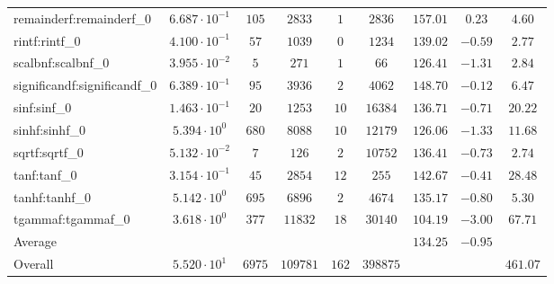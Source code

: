 \begin{tabular}{|l|c|c|c|c|c|c|c|c|}
remainderf:remainderf\_0     & $ 6.687 \cdot 10^{-1} $ & $ 105    $ & $ 2833   $ & $ 1   $ & $ 2836   $ & $ 157.01      $ & $ 0.23    $ & $ 4.60    $ \\
rintf:rintf\_0               & $ 4.100 \cdot 10^{-1} $ & $ 57     $ & $ 1039   $ & $ 0   $ & $ 1234   $ & $ 139.02      $ & $ -0.59   $ & $ 2.77    $ \\
scalbnf:scalbnf\_0           & $ 3.955 \cdot 10^{-2} $ & $ 5      $ & $ 271    $ & $ 1   $ & $ 66     $ & $ 126.41      $ & $ -1.31   $ & $ 2.84    $ \\
significandf:significandf\_0 & $ 6.389 \cdot 10^{-1} $ & $ 95     $ & $ 3936   $ & $ 2   $ & $ 4062   $ & $ 148.70      $ & $ -0.12   $ & $ 6.47    $ \\
sinf:sinf\_0                 & $ 1.463 \cdot 10^{-1} $ & $ 20     $ & $ 1253   $ & $ 10  $ & $ 16384  $ & $ 136.71      $ & $ -0.71   $ & $ 20.22   $ \\
sinhf:sinhf\_0               & $ 5.394 \cdot 10^{0}  $ & $ 680    $ & $ 8088   $ & $ 10  $ & $ 12179  $ & $ 126.06      $ & $ -1.33   $ & $ 11.68   $ \\
sqrtf:sqrtf\_0               & $ 5.132 \cdot 10^{-2} $ & $ 7      $ & $ 126    $ & $ 2   $ & $ 10752  $ & $ 136.41      $ & $ -0.73   $ & $ 2.74    $ \\
tanf:tanf\_0                 & $ 3.154 \cdot 10^{-1} $ & $ 45     $ & $ 2854   $ & $ 12  $ & $ 255    $ & $ 142.67      $ & $ -0.41   $ & $ 28.48   $ \\
tanhf:tanhf\_0               & $ 5.142 \cdot 10^{0}  $ & $ 695    $ & $ 6896   $ & $ 2   $ & $ 4674   $ & $ 135.17      $ & $ -0.80   $ & $ 5.30    $ \\
tgammaf:tgammaf\_0           & $ 3.618 \cdot 10^{0}  $ & $ 377    $ & $ 11832  $ & $ 18  $ & $ 30140  $ & $ 104.19      $ & $ -3.00   $ & $ 67.71   $ \\
\hline
Average                      & $                     $ & $        $ & $        $ & $     $ & $        $ & $ 134.25      $ & $ -0.95   $ & $         $ \\
\hline
Overall                      & $ 5.520 \cdot 10^{1}  $ & $ 6975   $ & $ 109781 $ & $ 162 $ & $ 398875 $ & $             $ & $         $ & $ 461.07  $ \\
\hline
\end{tabular}
